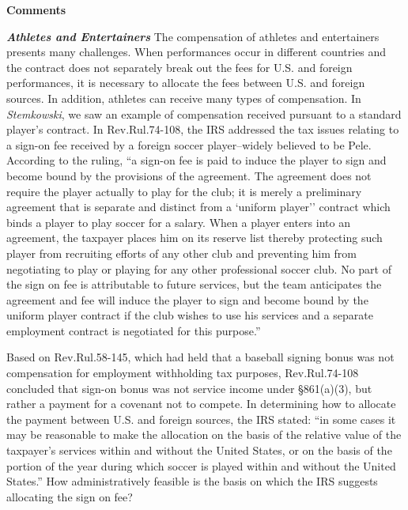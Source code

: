 	\begin{center}
			\textbf{Comments}
		\end{center}


\textbf{\emph{Athletes and Entertainers}}  The compensation of athletes and entertainers presents many challenges.  When performances occur in different countries and the contract does not separately break out the fees for U.S. and foreign performances, it is necessary to allocate the fees between U.S. and foreign sources.  In addition, athletes can receive many types of compensation. In \emph{Stemkowski}, we saw an example of compensation received pursuant to a standard player's contract.  In Rev.\@\@ Rul.\@ 74-108, the IRS addressed the tax issues relating to a sign-on fee received by a foreign soccer player--widely believed to be Pele.  According to the ruling, ``a sign-on fee is paid to induce the player to sign and become bound by the provisions of the agreement. The agreement does not require the player actually to play for the club; it is merely a preliminary agreement that is separate and distinct from a `uniform player'' contract which binds a player to play soccer for a salary. When a player enters into an agreement, the taxpayer places him on its reserve list thereby protecting such player from recruiting efforts of any other club and preventing him from negotiating to play or playing for any other professional soccer club. No part of the sign on fee is attributable to future services, but the team anticipates the agreement and fee will induce the player to sign and become bound by the uniform player contract if the club wishes to use his services and a separate employment contract is negotiated for this purpose.''  

Based on Rev.\@\@ Rul.\@ 58-145, which had held that a baseball signing bonus was not compensation for employment withholding tax purposes, Rev.\@\@ Rul.\@ 74-108 concluded that sign-on bonus was not service income under \S861(a)(3), but rather a payment for a covenant not to compete.  In determining how to allocate the payment between U.S. and foreign sources, the IRS stated: ``in some cases it may be reasonable to make the allocation on the basis of the relative value of the taxpayer's services within and without the United States, or on the basis of the portion of the year during which soccer is played within and without the United States.''  How administratively feasible is the basis on which the IRS suggests allocating the sign on fee? 


